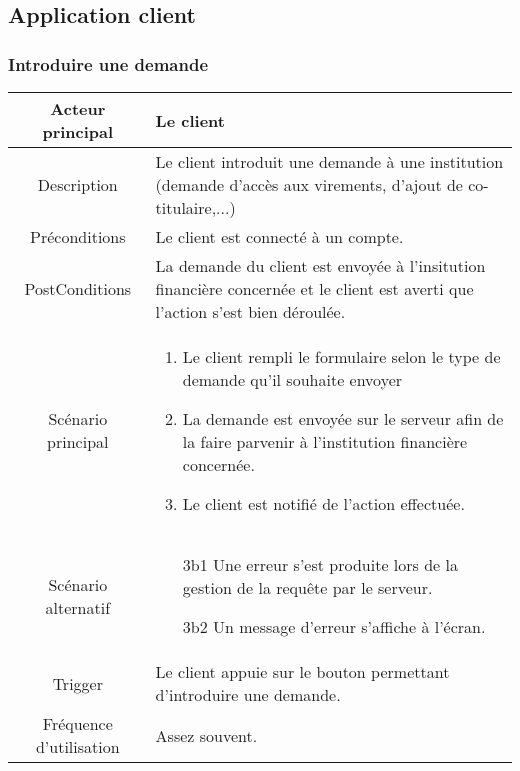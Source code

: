 \documentclass{article}
\begin{document}
\newpage

\subsection{Application client}
\subsubsection{Introduire une demande}
\begin{table}[h]
   \begin{tabular}{|c|p{10cm}|}
      \hline
      Acteur principal&Le client\\
      \hline
      Description&Le client introduit une demande à une institution (demande d'accès aux virements, d'ajout de co-titulaire,...)    \\
      \hline
      Préconditions&Le client est connecté à un compte.\\
      \hline
      PostConditions&La demande du client est envoyée à l'insitution financière concernée et le client est averti que l'action s'est bien déroulée.\\
      \hline
      Scénario principal& 
            \begin{enumerate}
               \item Le client rempli le formulaire selon le type de demande qu'il souhaite envoyer
               \item La demande est envoyée sur le serveur afin de la faire parvenir à l'institution financière concernée.
               \item Le client est notifié de l'action effectuée.
            \end{enumerate}     \\
      \hline
      Scénario alternatif&
            \begin{itemize}
               \item[3b1] Une erreur s'est produite lors de la gestion de la requête par le serveur.
               \item[3b2] Un message d'erreur s'affiche à l'écran.  
            \end{itemize}      \\
      \hline
      Trigger&Le client appuie sur le bouton permettant d'introduire une demande.\\
      \hline
      Fréquence d'utilisation&Assez souvent.\\
      \hline
   \end{tabular}
\end{table}
\end{document}
